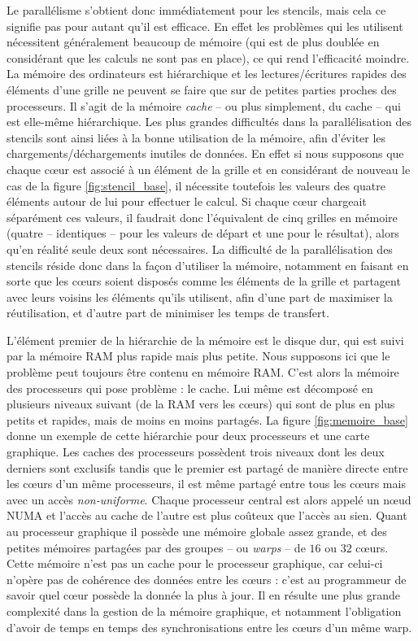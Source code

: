 Le parallélisme s'obtient donc immédiatement pour les stencils, mais cela ce signifie pas pour autant qu'il est efficace. En effet les problèmes qui les utilisent nécessitent généralement beaucoup de mémoire (qui est de plus doublée en considérant que les calculs ne sont pas en place), ce qui rend l'efficacité moindre. La mémoire des ordinateurs est hiérarchique et les lectures/écritures rapides des éléments d'une grille ne peuvent se faire que sur de petites parties proches des processeurs. Il s'agit de la mémoire \emph{cache} -- ou plus simplement, du cache -- qui est elle-même hiérarchique. Les plus grandes difficultés dans la parallélisation des stencils sont ainsi liées à la bonne utilisation de la mémoire, afin d'éviter les chargements/déchargements inutiles de données. En effet si nous supposons que chaque cœur est associé à un élément de la grille et en considérant de nouveau le cas de la figure \ref{fig:stencil_base}, il nécessite toutefois les valeurs des quatre éléments autour de lui pour effectuer le calcul. Si chaque cœur chargeait séparément ces valeurs, il faudrait donc l'équivalent de cinq grilles en mémoire (quatre -- identiques -- pour les valeurs de départ et une pour le résultat), alors qu'en réalité seule deux sont nécessaires. La difficulté de la parallélisation des stencils réside donc dans la façon d'utiliser la mémoire, notamment en faisant en sorte que les cœurs soient disposés comme les éléments de la grille et partagent avec leurs voisins les éléments qu'ils utilisent, afin d'une part de maximiser la réutilisation, et d'autre part de minimiser les temps de transfert.

L'élément premier de la hiérarchie de la mémoire est le disque dur, qui est suivi par la mémoire RAM plus rapide mais plus petite. Nous supposons ici que le problème peut toujours être contenu en mémoire RAM. C'est alors la mémoire des processeurs qui pose problème : le cache. Lui même est décomposé en plusieurs niveaux suivant (de la RAM vers les cœurs) qui sont de plus en plus petits et rapides, mais de moins en moins partagés. La figure \ref{fig:memoire_base} donne un exemple de cette hiérarchie pour deux processeurs et une carte graphique. Les caches des processeurs possèdent trois niveaux dont les deux derniers sont exclusifs tandis que le premier est partagé de manière directe entre les cœurs d'un même processeurs, il est même partagé entre tous les cœurs mais avec un accès \emph{non-uniforme}. Chaque processeur central est alors appelé un nœud NUMA et l'accès au cache de l'autre est plus coûteux que l'accès au sien. Quant au processeur graphique il possède une mémoire globale assez grande, et des petites mémoires partagées par des groupes -- ou \emph{warps} -- de $16$ ou $32$ cœurs. Cette mémoire n'est pas un cache pour le processeur graphique, car celui-ci n'opère pas de cohérence des données entre les cœurs : c'est au programmeur de savoir quel cœur possède la donnée la plus à jour. Il en résulte une plus grande complexité dans la gestion de la mémoire graphique, et notamment l'obligation d'avoir de temps en temps des synchronisations entre les cœurs d'un même warp. 

